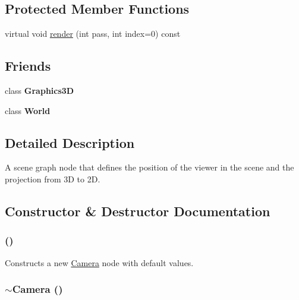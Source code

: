 \subsection*{Protected Member Functions}
\begin{CompactItemize}
\item 
virtual void \hyperlink{classm3g_1_1Camera_1efcb1973989d9963d5bd6d03065d389}{render} (int pass, int index=0) const 
\end{CompactItemize}
\subsection*{Friends}
\begin{CompactItemize}
\item 
\hypertarget{classm3g_1_1Camera_8174d4c629550c1ee279571250236ef4}{
class \textbf{Graphics3D}}
\label{classm3g_1_1Camera_8174d4c629550c1ee279571250236ef4}

\item 
\hypertarget{classm3g_1_1Camera_7b4bcdf992c21ae83363f25df05b1d25}{
class \textbf{World}}
\label{classm3g_1_1Camera_7b4bcdf992c21ae83363f25df05b1d25}

\end{CompactItemize}


\subsection{Detailed Description}
A scene graph node that defines the position of the viewer in the scene and the projection from 3D to 2D. 

\subsection{Constructor \& Destructor Documentation}
\hypertarget{classm3g_1_1Camera_a3f3efcb2fcc75de885df29041103cd2}{
\subsubsection[{Camera}]{ ()}}
\label{classm3g_1_1Camera_a3f3efcb2fcc75de885df29041103cd2}


Constructs a new \hyperlink{classm3g_1_1Camera}{Camera} node with default values. \hypertarget{classm3g_1_1Camera_b921e886e6f14e117eb8099ccb0a3775}{
\subsubsection[{$\sim$Camera}]{\setlength{\rightskip}{0pt plus 5cm}$\sim${\bf Camera} ()}}
\label{classm3g_1_1Camera_b921e886e6f14e117eb8099ccb0a3775}


